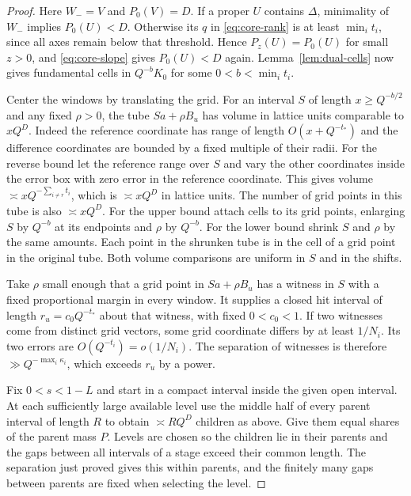 \documentclass[11pt,reqno,a4paper]{amsart}
\theoremstyle{remark}
\numberwithin{equation}{section}
\begin{document}
\begin{proof}
Here $W_-=V$ and $P_0(V)=D$. If a proper $U$ contains $\Delta$,
minimality of $W_-$ implies $P_0(U)<D$. Otherwise its $q$ in
\eqref{eq:core-rank} is at least $\min_i t_i$, since all axes remain
below that threshold. Hence $P_z(U)=P_0(U)$ for small $z>0$, and
\eqref{eq:core-slope} gives $P_0(U)<D$ again. Lemma~\ref{lem:dual-cells}
now gives fundamental cells in $Q^{-b}K_0$ for some
$0<b<\min_i t_i$.

Center the windows by translating the grid. For an interval $S$
of length $x\ge Q^{-b/2}$ and any fixed $\rho>0$, the tube
$Sa+\rho B_u$ has volume in lattice units comparable to $xQ^D$.
Indeed the reference coordinate has range of length
$O(x+Q^{-t_*})$ and the difference coordinates are bounded by a
fixed multiple of their radii. For the reverse bound let the
reference range over $S$ and vary the other coordinates inside
the error box with zero error in the reference coordinate. This
gives volume $\asymp xQ^{-\sum_{i\ne r}t_i}$, which is
$\asymp xQ^D$ in lattice units. The number of grid points in this
tube is also $\asymp xQ^D$. For the upper bound attach cells to
its grid points, enlarging $S$ by $Q^{-b}$ at its endpoints and
$\rho$ by $Q^{-b}$. For the lower bound shrink $S$ and $\rho$ by
the same amounts. Each point in the shrunken tube is in the cell
of a grid point in the original tube. Both volume comparisons
are uniform in $S$ and in the shifts.

Take $\rho$ small enough that a grid point in $Sa+\rho B_u$
has a witness in $S$ with a fixed proportional margin in every
window. It supplies a closed hit interval of length
$r_u=c_0Q^{-t_*}$ about that witness, with fixed $0<c_0<1$.
If two witnesses come from distinct grid vectors, some grid
coordinate differs by at least $1/N_i$. Its two errors are
$O(Q^{-t_i})=o(1/N_i)$. The separation of witnesses is therefore
$\gg Q^{-\max_i\kappa_i}$, which exceeds $r_u$ by a power.

Fix $0<s<1-L$ and start in a compact interval inside the given
open interval. At each sufficiently large available level use
the middle half of every parent interval of length $R$ to obtain
$\asymp RQ^D$ children as above. Give them equal shares of the
parent mass $P$. Levels are chosen so the children lie in their
parents and the gaps between all intervals of a stage exceed
their common length. The separation just proved gives this
within parents, and the finitely many gaps between parents are
fixed when selecting the level.


\end{proof}
\end{document}
